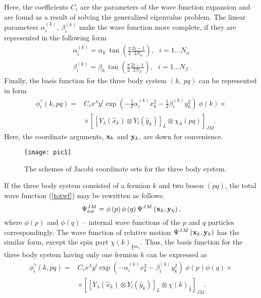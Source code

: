\documentclass[
12pt, %
oneside, %
english, %
onehalfspacing, %
onehalfspacing, %
headsepline, %
]{MastersDoctoralThesis} %
\begin{document}
Here, the coefficients $ C_{i} $ are the parameters of the wave function expansion and are found as a result of solving the generalized eigenvalue problem. 
The linear parameters  $ \alpha^{(k)} _ {i} $, $ \beta^{(k)}_{i}$ 
make the wave function more complete, if they are represented in the following form
\begin{align}
\alpha^{(k)} _ {i} = \alpha_0~ \tan 
\left( \frac{\pi}{2} \frac{2i-1}{2N_\alpha} \right),
 ~~~ i=1...N_\alpha \\
\beta^{(k)} _ {i} = \beta_0~  \tan 
\left( \frac{\pi}{2} \frac{2i-1}{2N_\beta} \right),
~~~ i=1...N_\beta
\end{align}
Finally, the basis function for the three body system $(k,~pq)$ can be represented in form 
\begin{align}
\phi_{i}^{\gamma} \left(k, pq \right)=&
C_i  x^\lambda y^l 
\exp\left( - \tfrac{1}{2} \alpha_i^{(k)} x^2_k - \tfrac{1}{2} \beta_i^{(k)} y^2_k \right)~
\phi \left( k \right) 
\times \nonumber \\
& \times \left[ \left[ 
Y_\lambda \left(\hat{x}_k \right) \otimes Y_l \left(\hat{y}_k \right)
\right]_{L} \otimes \chi_S (pq) \right]_{JM}.
\label{basis_function_1}
\end{align}
Here, the coordinate arguments, ${\bf x}_k$ and ${\bf y}_k$,   are down for convenience.

\begin{figure}[b]
\centering
\texttt{[image: pic1]}
\decoRule
\caption{\footnotesize The schemes of Jacobi coordinate sets for the three body system.}
\label{fig:jacobiSet}
\end{figure}

If the three body system consisted of a fermion $k$ and two boson $(pq)$, the total wave function (\ref{totwf}) may be rewritten as follows:
\begin{equation}
\Psi^{JM}_{tot} 
 = \phi\left( p \right) 
 \phi\left( q \right) 
 \Psi^{JM}\left( {\bf x}_k, {\bf y}_k \right),
\end{equation} 
where $\phi\left( p \right)$ and $\phi\left( q \right) $ -- internal wave functions of the $p$ and $q$ particles correspondingly.
The wave function of relative motion $\Psi^{JM}\left( {\bf x}_k, {\bf y}_k \right)$ has the similar form, except the spin part $\chi(k)_{\tfrac{1}{2}m_s}$. Thus, the basis function for the three body system having only one fermion $k$ can be expressed as
\begin{align}
\phi_{i}^{\gamma} \left(k, pq \right)=&
C_i  x^\lambda y^l 
\exp\left( - \alpha_i^{(k)} x^2_k - \beta_i^{(k)} y^2_k \right)~
\phi\left( p \right) 
 \phi\left( q \right) 
\times \nonumber \\
& \times \left[ \left[ 
Y_\lambda \left(\hat{x}_k \right) \otimes Y_l \left(\hat{y}_k \right)
\right]_{L} \otimes \chi(k)_{\tfrac{1}{2}} \right]_{JM}.
\label{basis_function_2}
\end{align}
\end{document}

